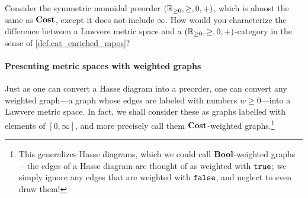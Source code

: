 \documentclass[7Sketches]{subfiles}
\begin{document}
\begin{exercise}%
\label{exc.finite_Lawvere}
Consider the symmetric monoidal preorder $(\mathbb{R}_{\geq0},\geq,0,+)$, which is almost the same as $\mathbf{Cost}$, except it does not include $\infty$. How would you characterize the difference between a Lawvere metric space and a $(\mathbb{R}_{\geq0},\geq,0,+)$-category in the sense of \cref{def.cat_enriched_mpos}?
\end{exercise}



\paragraph{Presenting metric spaces with weighted graphs}%
%
%
%
Just as one can convert a Hasse diagram into a preorder, one can convert any
weighted graph---a graph whose edges are labeled with numbers $w\geq 0$---into a
Lawvere metric space. In fact, we shall consider these as graphs labelled with
elements of $[0,\infty]$, and more precisely call them $\mathbf{Cost}$-weighted
graphs.\footnote{This generalizes Hasse diagrams, which we could
call $\mathbf{Bool}$-weighted graphs---the edges of a Hasse diagram are thought of as
weighted with $\mathtt{true}$; we simply ignore any edges that are weighted with
$\mathtt{false}$, and neglect to even draw them!}%
\end{document}

